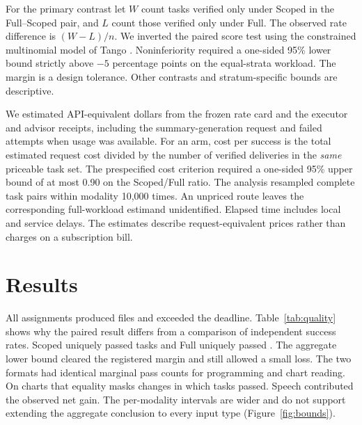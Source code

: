 \documentclass[10pt]{article}
\begin{document}
For the primary contrast let $W$ count tasks verified only under Scoped in the Full--Scoped pair, and $L$ count those verified only under Full. The observed rate difference is $(W-L)/n$. We inverted the paired score test using the constrained multinomial model of Tango \cite{tango}. Noninferiority required a one-sided 95\% lower bound strictly above $-5$ percentage points on the equal-strata workload. The margin is a design tolerance. Other contrasts and stratum-specific bounds are descriptive.

We estimated API-equivalent dollars from the frozen rate card and the executor and advisor receipts, including the summary-generation request and failed attempts when usage was available. For an arm, cost per success is the total estimated request cost divided by the number of verified deliveries in the \emph{same} priceable task set. The prespecified cost criterion required a one-sided 95\% upper bound of at most 0.90 on the Scoped/Full ratio. The analysis resampled complete task pairs within modality 10,000 times. An unpriced route leaves the corresponding full-workload estimand unidentified. Elapsed time includes local and service delays. The estimates describe request-equivalent prices rather than charges on a subscription bill.

\section{Results}
\begin{table}[ht]
\centering
\caption{Files verified by deadline and paired Scoped--Full differences. $W$ and $L$ count discordant tasks. Differences and one-sided 95\% lower bounds are in percentage points.}
\label{tab:quality}
\end{table}

All \Assignments{} assignments produced files and \LateCount{} exceeded the deadline. Table~\ref{tab:quality} shows why the paired result differs from a comparison of independent success rates. Scoped uniquely passed \ScopedOnly{} tasks and Full uniquely passed \FullOnly{}. The aggregate lower bound cleared the registered margin and still allowed a small loss. The two formats had identical marginal pass counts for programming and chart reading. On charts that equality masks changes in which tasks passed. Speech contributed the observed net gain. The per-modality intervals are wider and do not support extending the aggregate conclusion to every input type (Figure~\ref{fig:bounds}).
\end{document}
